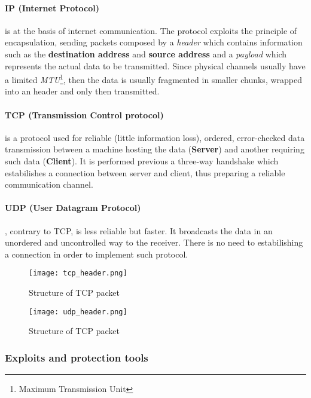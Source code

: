 \documentclass[../../main.tex]{subfiles}
\begin{document}
    \paragraph{IP (Internet Protocol)} is at the basis of internet communication.
    The protocol exploits the principle of encapsulation, sending packets
    composed by a \emph{header} which contains information such as the
    \textbf{destination address} and \textbf{source address} and a
    \emph{payload} which represents the actual data to be transmitted.
    Since physical channels usually have a limited \emph{MTU}\footnote{Maximum
    Transmission Unit}, then the data is usually fragmented in smaller chunks,
    wrapped into an header and only then transmitted.
    
    \paragraph{TCP (Transmission Control protocol)} is a protocol used for reliable
    (little information loss), ordered, error-checked data transmission between
    a machine hosting the data (\textbf{Server}) and another requiring such data
    (\textbf{Client}). It is performed previous a three-way handshake which
    estabilishes a connection between server and client, thus preparing a
    reliable communication channel.

    \paragraph{UDP (User Datagram Protocol)}, contrary to TCP, is less reliable but
    faster.
    It broadcasts the data in an unordered and uncontrolled way to the receiver. 
    There is no need to estabilishing a connection in order to implement such
    protocol.

    \begin{figure}[h]
        \centering
        \caption{Structure of TCP packet}
        \texttt{[image: tcp\_header.png]}
    \end{figure}

    \begin{figure}[h]
        \centering
        \caption{Structure of TCP packet}
        \texttt{[image: udp\_header.png]}
    \end{figure}

    \pagebreak

    \subsubsection{Exploits and protection tools}
\end{document}
